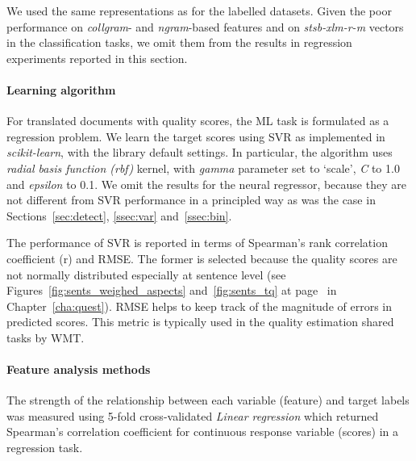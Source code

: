 We used the same representations as for the labelled datasets. 
Given the poor performance on \textit{collgram}- and \textit{ngram}-based features and on \textit{stsb-xlm-r-m} vectors in the classification tasks, we omit them from the results in regression experiments reported in this section. 

\paragraph{Learning algorithm}
For translated documents with quality scores, the ML task is formulated as a regression problem. We learn the target scores using \gls{SVR} as implemented in \textit{scikit-learn}, with the library default settings. In particular, the algorithm uses \textit{radial basis function (rbf)} kernel, with \textit{gamma} parameter set to `scale', \textit{C} to 1.0 and \textit{epsilon} to 0.1.
We omit the results for the neural regressor, because they are not different from SVR performance in a principled way as was the case in Sections~\ref{sec:detect}, \ref{ssec:var} and~\ref{ssec:bin}.

The performance of \gls{SVR} is reported in terms of Spearman's rank correlation coefficient (r) and \gls{RMSE}. The former is selected because the quality scores are not normally distributed especially at sentence level (see Figures~\ref{fig:sents_weighed_aspects} and~\ref{fig:sents_tq} at page~\pageref{pg:skews} in Chapter~\ref{cha:quest}). \gls{RMSE} helps to keep track of the magnitude of errors in predicted scores. This metric is typically used in the quality estimation shared tasks by \gls{WMT}.

\paragraph{Feature analysis methods}
The strength of the relationship between each variable (feature) and target labels was measured using 5-fold cross-validated \textit{Linear regression} which returned Spearman's correlation coefficient for continuous response variable (scores) in a regression task. 


